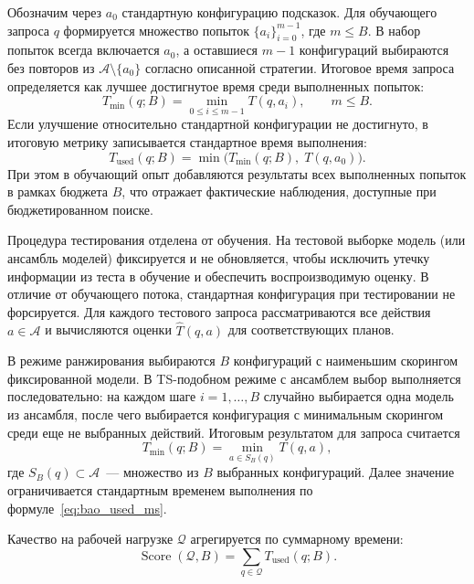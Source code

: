 Обозначим через $a_0$ стандартную конфигурацию подсказок. Для обучающего запроса $q$ формируется множество попыток $\{a_i\}_{i=0}^{m-1}$, где $m\le B$. В набор попыток всегда включается $a_0$, а оставшиеся $m-1$ конфигураций выбираются без повторов из $\mathcal{A}\setminus\{a_0\}$ согласно описанной стратегии. Итоговое время запроса определяется как лучшее достигнутое время среди выполненных попыток:
\begin{equation}
\label{eq:bao_best_of_b}
T_{\min}(q;B) = \min_{0 \le i \le m-1} T(q,a_i), \qquad m \le B.
\end{equation}
Если улучшение относительно стандартной конфигурации не достигнуто, в итоговую метрику записывается стандартное время выполнения:
\begin{equation}
\label{eq:bao_used_ms}
T_{\text{used}}(q;B)=\min\bigl(T_{\min}(q;B),\;T(q,a_0)\bigr).
\end{equation}
При этом в обучающий опыт добавляются результаты всех выполненных попыток в рамках бюджета $B$, что отражает фактические наблюдения, доступные при бюджетированном поиске.

Процедура тестирования отделена от обучения. На тестовой выборке модель (или ансамбль моделей) фиксируется и не обновляется, чтобы исключить утечку информации из теста в обучение и обеспечить воспроизводимую оценку. В отличие от обучающего потока, стандартная конфигурация при тестировании не форсируется. Для каждого тестового запроса рассматриваются все действия $a\in\mathcal{A}$ и вычисляются оценки $\widehat{T}(q,a)$ для соответствующих планов.

В режиме ранжирования выбираются $B$ конфигураций с наименьшим скорингом фиксированной модели. В TS-подобном режиме с ансамблем выбор выполняется последовательно: на каждом шаге $i=1,\dots,B$ случайно выбирается одна модель из ансамбля, после чего выбирается конфигурация с минимальным скорингом среди еще не выбранных действий. Итоговым результатом для запроса считается
\begin{equation}
T_{\min}(q;B)=\min_{a\in S_B(q)} T(q,a),
\end{equation}
где $S_B(q)\subset\mathcal{A}$~--- множество из $B$ выбранных конфигураций. Далее значение ограничивается стандартным временем выполнения по формуле~\cref{eq:bao_used_ms}.

Качество на рабочей нагрузке $\mathcal{Q}$ агрегируется по суммарному времени:
\begin{equation}
\label{eq:bao_workload_score}
\operatorname{Score}(\mathcal{Q}, B) = \sum_{q\in\mathcal{Q}} T_{\text{used}}(q;B).
\end{equation}

